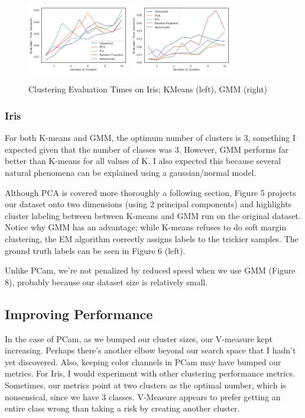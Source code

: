 \documentclass[letter]{article}
\begin{document}
\begin{figure}
  \centering
  \includegraphics[width=0.4\textwidth]{images/kmeansIrisTime.png}
  \includegraphics[width=0.4\textwidth]{images/gmmIrisTime.png}
  \caption{Clustering Evaluation Times on Iris; KMeans (left), GMM (right)}
\end{figure}

\subsubsection{Iris}
For both K-means and GMM, the optimum number of clusters is 3, something I expected given that the number of classes was 3. However, GMM performs far better than K-means for all values of K. I also expected this because several natural phenomena can be explained using a gaussian/normal model.

Although PCA is covered more thoroughly a following section, Figure 5 projects our dataset onto two dimensions (using 2 principal components) and highlights cluster labeling between between K-means and GMM run on the original dataset. Notice why GMM has an advantage; while K-means refuses to do soft margin clustering, the EM algorithm correctly assigns labels to the trickier samples. The ground truth labels can be seen in Figure 6 (left). 

Unlike PCam, we're not penalized by reduced speed when we use GMM (Figure 8), probably because our dataset size is relatively small.

\subsection{Improving Performance}
In the case of PCam, as we bumped our cluster sizes, our V-measure kept increasing. Perhaps there's another elbow beyond our search space that I hadn't yet discovered. Also, keeping color channels in PCam may have bumped our metrics. For Iris, I would experiment with other clustering performance metrics. Sometimes, our metrics point at two clusters as the optimal number, which is nonsensical, since we have 3 classes. V-Measure appears to prefer getting an entire class wrong than taking a risk by creating another cluster.
\end{document}
